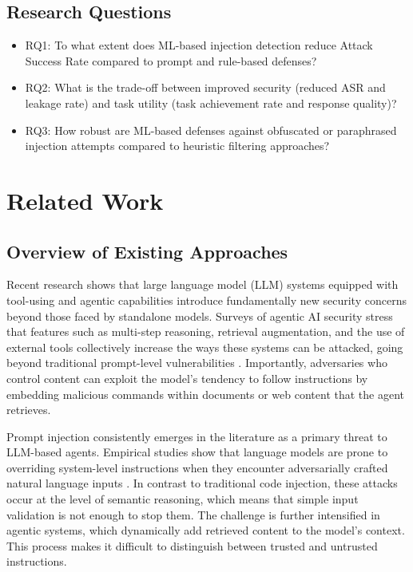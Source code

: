 \documentclass[11pt]{article}
\begin{document}
\subsection*{Research Questions}

\begin{itemize}
    \item RQ1: To what extent does ML-based injection detection reduce Attack Success Rate compared to prompt and rule-based defenses?
    
    \item RQ2: What is the trade-off between improved security (reduced ASR and leakage rate) and task utility (task achievement rate and response quality)?
    
    \item RQ3: How robust are ML-based defenses against obfuscated or paraphrased injection attempts compared to heuristic filtering approaches?
\end{itemize}

\section{Related Work}

\subsection{Overview of Existing Approaches}

Recent research shows that large language model (LLM) systems equipped with tool-using and agentic capabilities introduce fundamentally new security concerns beyond those faced by standalone models. Surveys of agentic AI security stress that features such as multi-step reasoning, retrieval augmentation, and the use of external tools collectively increase the ways these systems can be attacked, going beyond traditional prompt-level vulnerabilities \cite{schroeder2025multiagent, deng2025agentsurvey}. Importantly, adversaries who control content can exploit the model's tendency to follow instructions by embedding malicious commands within documents or web content that the agent retrieves.

Prompt injection consistently emerges in the literature as a primary threat to LLM-based agents. Empirical studies show that language models are prone to overriding system-level instructions when they encounter adversarially crafted natural language inputs \cite{greshake2023prompt}. In contrast to traditional code injection, these attacks occur at the level of semantic reasoning, which means that simple input validation is not enough to stop them. The challenge is further intensified in agentic systems, which dynamically add retrieved content to the model's context. This process makes it difficult to distinguish between trusted and untrusted instructions.
\end{document}
